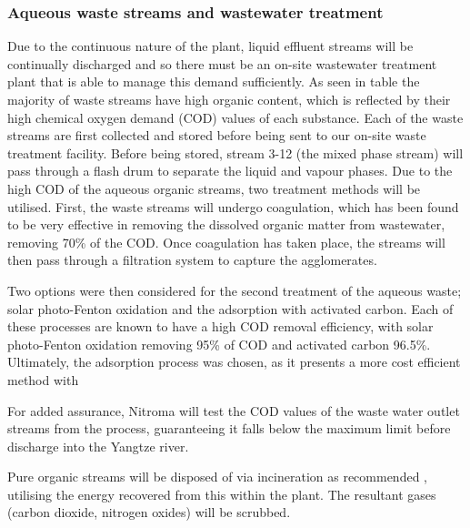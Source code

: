 \subsubsection{Aqueous waste streams and wastewater treatment}

Due to the continuous nature of the plant, liquid effluent streams will be continually discharged and so there must be an on-site wastewater treatment plant that is able to manage this demand sufficiently. %
As seen in table %
the majority of waste streams have high organic content, which is reflected by their high chemical oxygen demand (COD) values of each substance. Each of the waste streams are first collected and stored before being sent to our on-site waste treatment facility. Before being stored, stream 3-12 (the mixed phase stream) will pass through a flash drum to separate the liquid and vapour phases. Due to the high COD of the aqueous organic streams, two treatment methods will be utilised. First, the waste streams will undergo coagulation, which has been found to be very effective in removing the dissolved organic matter from wastewater, removing 70\% of the COD. Once coagulation has taken place, the streams will then pass through a filtration system to capture the agglomerates. 



Two options were then considered for the second treatment of the aqueous waste; solar photo-Fenton oxidation and the adsorption with activated carbon. Each of these processes are known to have a high COD removal efficiency, with solar photo-Fenton oxidation removing 95\% of COD and activated carbon 96.5\%. Ultimately, the adsorption process was chosen, as it presents a more cost efficient method with 

For added assurance, Nitroma will test the COD values of the waste water outlet streams from the process, guaranteeing it falls below the maximum limit before discharge into the Yangtze river. 



Pure organic streams will be disposed of via incineration as recommended \cite{sinnott_coulson_2005}, utilising the energy recovered from this within the plant. The resultant gases (carbon dioxide, nitrogen oxides) will be scrubbed. %


